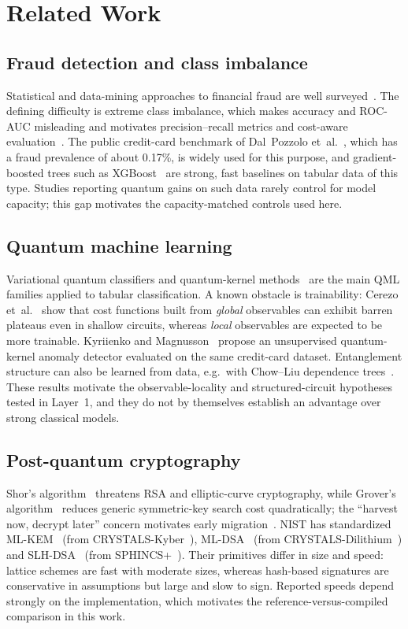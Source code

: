 \section{Related Work}\label{sec:related}
\subsection{Fraud detection and class imbalance}
Statistical and data-mining approaches to financial fraud are well surveyed~\cite{bolton,ngai}. The defining difficulty is extreme class imbalance, which makes accuracy and ROC-AUC misleading and motivates precision--recall metrics and cost-aware evaluation~\cite{haixiang}. The public credit-card benchmark of Dal~Pozzolo et~al.~\cite{dalpozzolo}, which has a fraud prevalence of about 0.17\%, is widely used for this purpose, and gradient-boosted trees such as XGBoost~\cite{xgboost} are strong, fast baselines on tabular data of this type. Studies reporting quantum gains on such data rarely control for model capacity; this gap motivates the capacity-matched controls used here.

\subsection{Quantum machine learning}
Variational quantum classifiers and quantum-kernel methods~\cite{havlicek,schuld} are the main QML families applied to tabular classification. A known obstacle is trainability: Cerezo et~al.~\cite{cerezo} show that cost functions built from \emph{global} observables can exhibit barren plateaus even in shallow circuits, whereas \emph{local} observables are expected to be more trainable. Kyriienko and Magnusson~\cite{kyriienko} propose an unsupervised quantum-kernel anomaly detector evaluated on the same credit-card dataset. Entanglement structure can also be learned from data, e.g.\ with Chow--Liu dependence trees~\cite{chowliu}. These results motivate the observable-locality and structured-circuit hypotheses tested in Layer~1, and they do not by themselves establish an advantage over strong classical models.

\subsection{Post-quantum cryptography}
Shor's algorithm~\cite{shor} threatens RSA and elliptic-curve cryptography, while Grover's algorithm~\cite{grover} reduces generic symmetric-key search cost quadratically; the ``harvest now, decrypt later'' concern motivates early migration~\cite{mosca,nistir8105}. NIST has standardized ML-KEM~\cite{nist203} (from CRYSTALS-Kyber~\cite{kyber}), ML-DSA~\cite{nist204} (from CRYSTALS-Dilithium~\cite{dilithium}) and SLH-DSA~\cite{nist205} (from SPHINCS+~\cite{sphincs}). Their primitives differ in size and speed: lattice schemes are fast with moderate sizes, whereas hash-based signatures are conservative in assumptions but large and slow to sign. Reported speeds depend strongly on the implementation, which motivates the reference-versus-compiled comparison in this work.


